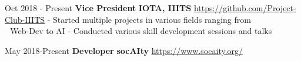 \documentclass[letterpaper]{twentysecondcv} %
\begin{document}
{\begin{twenty}
	
\end{twenty}



\begin{twenty} %
	\twentyitem
	{Oct 2018 - Present}
	{\textbf{Vice President}}
	{\textbf{IOTA, IIITS} \quad
	{\faExternalLinkSquare \enspace \underline{\url{ https://github.com/Project-Club-IIITS}} \vspace{2mm}}
	}
	{
	 - Started multiple projects in various fields ranging from \\ \textcolor{white}{-} Web-Dev to AI \newline 
	 - Conducted various skill development sessions and talks \newline}{}
	
	\twentyitem
	{May 2018-Present}
	{\textbf{Developer}}
	{\textbf{socAIty} \quad
	{\faExternalLinkSquare \enspace \underline{\url{ https://www.socaity.org/}} \vspace{2mm}}
	}
	{}


\end{twenty}








}
\end{document}

